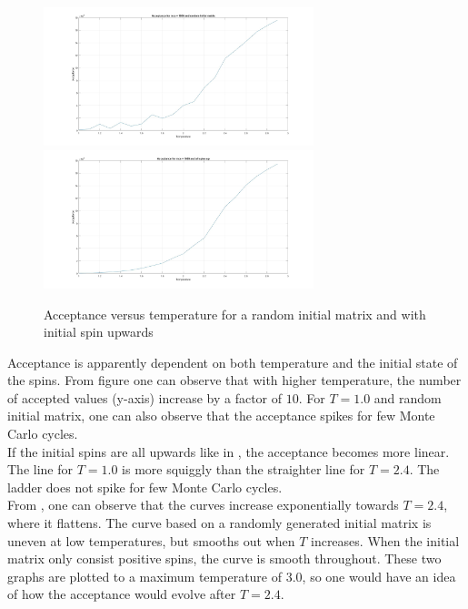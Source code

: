 \documentclass[10pt,a4paper]{article}
\begin{document}
\begin{figure}[H]
\centerline{
\includegraphics[width=0.7\textwidth]{acceptanceVStrandom}
\includegraphics[width=0.7\textwidth]{acceptanceVStupspin}
}
\caption{Acceptance versus temperature for a random initial matrix and with initial spin upwards}
\label{fig:acceptancetemp}
\end{figure}

\noindent Acceptance is apparently dependent on both temperature and the initial state of the spins. From figure  one can observe that with higher temperature, the number of accepted values (y-axis) increase by a factor of $10$. For $T = 1.0$ and random initial matrix, one can also observe that the acceptance spikes for few Monte Carlo cycles. 
\\
If the initial spins are all upwards like in , the acceptance becomes more linear. The line for $T = 1.0$ is more squiggly than the straighter line for $T = 2.4$. The ladder does not spike for few Monte Carlo cycles.
\\
From , one can observe that the curves increase exponentially towards $T = 2.4$, where it flattens. The curve based on a randomly generated initial matrix is uneven at low temperatures, but smooths out when $T$ increases. When the initial matrix only consist positive spins, the curve is smooth throughout. These two graphs are plotted to a maximum temperature of $3.0$, so one would have an idea of how the acceptance would evolve after $T = 2.4$. 
\end{document}
